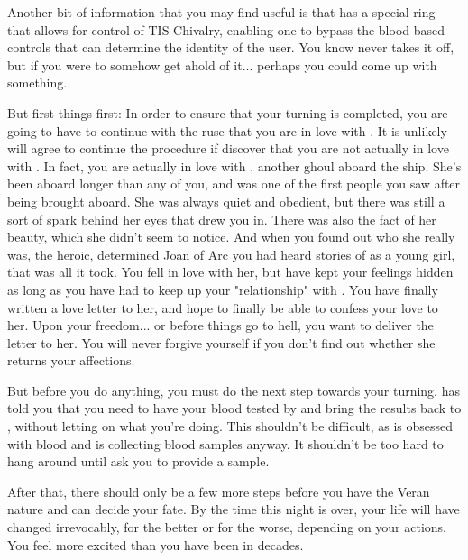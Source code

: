 \documentclass[char]{guildcamp4}
\begin{document}
Another bit of information that you may find useful is that \cVone{} has a special ring that allows for control of TIS Chivalry, enabling one to bypass the blood-based controls that can determine the identity of the user. You know \cVone{} never takes it off, but if you were to somehow get ahold of it... perhaps you could come up with something.

But first things first: In order to ensure that your turning is completed, you are going to have to continue with the ruse that you are in love with \cVtwo{\them}. It is unlikely \cVtwo{\they} will agree to continue the procedure if \cVtwo{\they} discover that you are not actually in love with \cVtwo{\them}. In fact, you are actually in love with \cJoan{}, another ghoul aboard the ship. She's been aboard longer than any of you, and was one of the first people you saw after being brought aboard. She was always quiet and obedient, but there was still a sort of spark behind her eyes that drew you in. There was also the fact of her beauty, which she didn't seem to notice. And when you found out who she really was, the heroic, determined Joan of Arc you had heard stories of as a young girl, that was all it took. You fell in love with her, but have kept your feelings hidden as long as you have had to keep up your "relationship" with \cVtwo{}. You have finally written a love letter to her, and hope to finally be able to confess your love to her. Upon your freedom... or before things go to hell, you want to deliver the letter to her. You will never forgive yourself if you don't find out whether she returns your affections.

But before you do anything, you must do the next step towards your turning. \cVtwo{} has told you that you need to have your blood tested by \cVthree{} and bring the results back to \cVtwo{\them}, without letting on what you're doing. This shouldn't be difficult, as \cVthree{} is obsessed with blood and is collecting blood samples anyway. It shouldn't be too hard to hang around \cVthree{\them} until \cVthree{\they} ask you to provide a sample.

After that, there should only be a few more steps before you have the Veran nature and can decide your fate. By the time this night is over, your life will have changed irrevocably, for the better or for the worse, depending on your actions. You feel more excited than you have been in decades.
\end{document}
